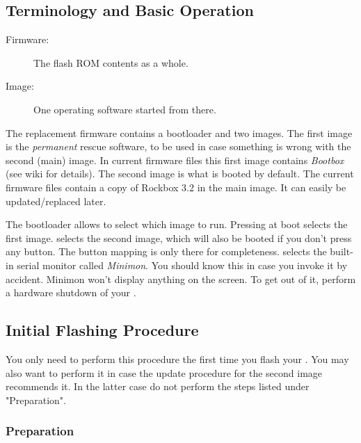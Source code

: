 \subsection{Terminology and Basic Operation}

\begin{description}
\item[Firmware:] The flash ROM contents as a whole.
\item[Image:] One operating software started from there.
\end{description}

The replacement firmware contains a bootloader and two images. The first image
is the \emph{permanent} rescue software, to be used in case something is wrong
with the second (main) image. In current firmware files this first image
contains \emph{Bootbox} (see wiki for details). The second image is what is
booted by default. The current firmware files contain a copy of Rockbox 3.2
in the main image. It can easily be updated/replaced later.

The bootloader allows to select which image to run. Pressing
 at boot
selects the first image.
selects the second image, which will also be booted if you don't press any
button. The button mapping is only there for completeness.
selects the built-in serial monitor called \emph{Minimon}. You should know this
in case you invoke it by accident. Minimon won't display anything on the
screen. To get out of it, perform a hardware shutdown of your \dap.

\subsection{Initial Flashing Procedure}

You only need to perform this procedure the first time you flash your
\archosplayertype. You may also want to perform it in case the update procedure for
the second image recommends it. In the latter case do not perform the steps
listed under "Preparation".

\subsubsection{Preparation}


